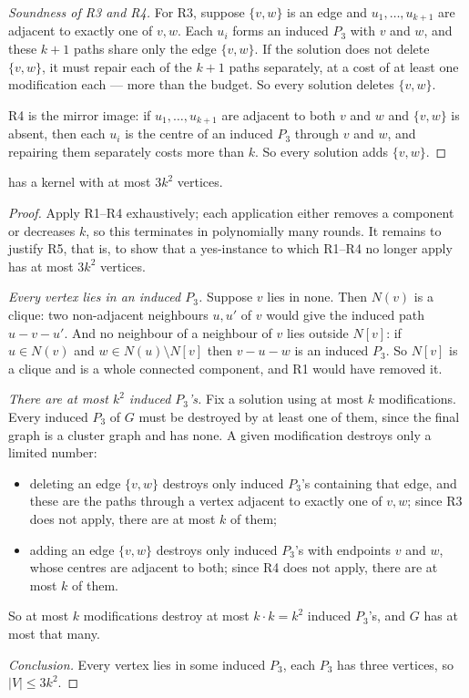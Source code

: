 \begin{proof}[Soundness of R3 and R4]
For R3, suppose $\{v,w\}$ is an edge and $u_1,\ldots,u_{k+1}$ are adjacent to
exactly one of $v,w$. Each $u_i$ forms an induced $P_3$ with $v$ and $w$, and
these $k+1$ paths share only the edge $\{v,w\}$. If the solution does not delete
$\{v,w\}$, it must repair each of the $k+1$ paths separately, at a cost of at
least one modification each --- more than the budget. So every solution deletes
$\{v,w\}$.

R4 is the mirror image: if $u_1,\ldots,u_{k+1}$ are adjacent to both $v$ and $w$
and $\{v,w\}$ is absent, then each $u_i$ is the centre of an induced $P_3$
through $v$ and $w$, and repairing them separately costs more than $k$. So every
solution adds $\{v,w\}$.
\end{proof}

\begin{theorem}\label{thm:cluster-kernel}
 has a kernel with at most $3k^2$ vertices.
\end{theorem}

\begin{proof}
Apply R1--R4 exhaustively; each application either removes a component or
decreases $k$, so this terminates in polynomially many rounds. It remains to
justify R5, that is, to show that a yes-instance to which R1--R4 no longer apply
has at most $3k^2$ vertices.

\emph{Every vertex lies in an induced $P_3$.} Suppose $v$ lies in none. Then
$N(v)$ is a clique: two non-adjacent neighbours $u,u'$ of $v$ would give the
induced path $u - v - u'$. And no neighbour of a neighbour of $v$ lies outside
$N[v]$: if $u \in N(v)$ and $w \in N(u) \setminus N[v]$ then $v - u - w$ is an
induced $P_3$. So $N[v]$ is a clique and is a whole connected component, and R1
would have removed it.

\emph{There are at most $k^2$ induced $P_3$'s.} Fix a solution using at most $k$
modifications. Every induced $P_3$ of $G$ must be destroyed by at least one of
them, since the final graph is a cluster graph and has none. A given
modification destroys only a limited number:
\begin{itemize}[leftmargin=*,nosep]
  \item deleting an edge $\{v,w\}$ destroys only induced $P_3$'s containing that
        edge, and these are the paths through a vertex adjacent to exactly one
        of $v,w$; since R3 does not apply, there are at most $k$ of them;
  \item adding an edge $\{v,w\}$ destroys only induced $P_3$'s with endpoints
        $v$ and $w$, whose centres are adjacent to both; since R4 does not
        apply, there are at most $k$ of them.
\end{itemize}
So at most $k$ modifications destroy at most $k \cdot k = k^2$ induced $P_3$'s,
and $G$ has at most that many.

\emph{Conclusion.} Every vertex lies in some induced $P_3$, each $P_3$ has three
vertices, so $|V| \le 3k^2$.
\end{proof}

